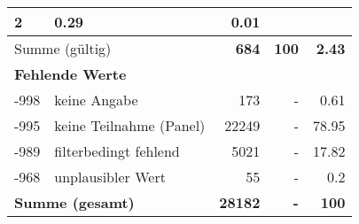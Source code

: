 \begin{longtable}{lXrrr}
       \num{2} &
       \num[round-mode=places,round-precision=2]{0.29} &
         \num[round-mode=places,round-precision=2]{0.01} \\
     \midrule
     \multicolumn{2}{l}{Summe (gültig)} &
       \textbf{\num{684}} &
     \textbf{100} &
       \textbf{\num[round-mode=places,round-precision=2]{2.43}} \\
     \multicolumn{5}{l}{\textbf{Fehlende Werte}}\\
       -998 &
       keine Angabe &
         \num{173} &
        - &
         \num[round-mode=places,round-precision=2]{0.61} \\
       -995 &
       keine Teilnahme (Panel) &
         \num{22249} &
        - &
         \num[round-mode=places,round-precision=2]{78.95} \\
       -989 &
       filterbedingt fehlend &
         \num{5021} &
        - &
         \num[round-mode=places,round-precision=2]{17.82} \\
       -968 &
       unplausibler Wert &
         \num{55} &
        - &
         \num[round-mode=places,round-precision=2]{0.2} \\
     \midrule
     \multicolumn{2}{l}{\textbf{Summe (gesamt)}} &
          \textbf{\num{28182}} &
        \textbf{-} &
        \textbf{100} \\
     \bottomrule
     \end{longtable}
     
